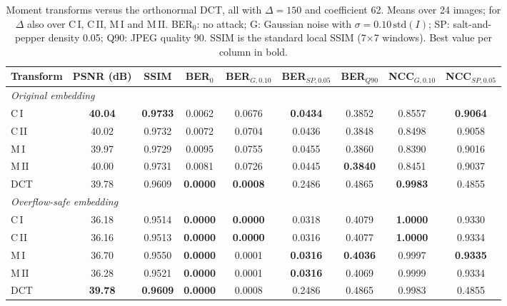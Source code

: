 \begin{table}[t]
\centering
\caption{Moment transforms versus the orthonormal DCT, all with $\Delta=150$ and coefficient 62. Means over 24 images; for $\Delta$ also over C\,I, C\,II, M\,I and M\,II. BER$_0$: no attack; G: Gaussian noise with $\sigma = 0.10\,\mathrm{std}(I)$; SP: salt-and-pepper density 0.05; Q90: JPEG quality 90. SSIM is the standard local SSIM (7$\times$7 windows). Best value per column in bold.}
\label{tab:moments_vs_baselines}
\setlength{\tabcolsep}{3pt}
\footnotesize
\begin{tabular}{lcccccccc}
\toprule
Transform & PSNR (dB) & SSIM & BER$_{0}$ & BER$_{G,0.10}$ & BER$_{SP,0.05}$ & BER$_{Q90}$ & NCC$_{G,0.10}$ & NCC$_{SP,0.05}$ \\
\midrule
\multicolumn{9}{l}{\emph{Original embedding}} \\
C\,I & \textbf{40.04} & \textbf{0.9733} & 0.0062 & 0.0676 & \textbf{0.0434} & 0.3852 & 0.8557 & \textbf{0.9064} \\
C\,II & 40.02 & 0.9732 & 0.0072 & 0.0704 & 0.0436 & 0.3848 & 0.8498 & 0.9058 \\
M\,I & 39.97 & 0.9729 & 0.0095 & 0.0755 & 0.0455 & 0.3860 & 0.8390 & 0.9016 \\
M\,II & 40.00 & 0.9731 & 0.0081 & 0.0726 & 0.0445 & \textbf{0.3840} & 0.8451 & 0.9037 \\
DCT & 39.78 & 0.9609 & \textbf{0.0000} & \textbf{0.0008} & 0.2486 & 0.4865 & \textbf{0.9983} & 0.4855 \\
\midrule
\multicolumn{9}{l}{\emph{Overflow-safe embedding}} \\
C\,I & 36.18 & 0.9514 & \textbf{0.0000} & \textbf{0.0000} & 0.0318 & 0.4079 & \textbf{1.0000} & 0.9330 \\
C\,II & 36.16 & 0.9513 & \textbf{0.0000} & \textbf{0.0000} & 0.0316 & 0.4077 & \textbf{1.0000} & 0.9334 \\
M\,I & 36.70 & 0.9550 & \textbf{0.0000} & 0.0001 & \textbf{0.0316} & \textbf{0.4036} & 0.9997 & \textbf{0.9335} \\
M\,II & 36.28 & 0.9521 & \textbf{0.0000} & 0.0001 & \textbf{0.0316} & 0.4069 & 0.9999 & 0.9334 \\
DCT & \textbf{39.78} & \textbf{0.9609} & \textbf{0.0000} & 0.0008 & 0.2486 & 0.4865 & 0.9983 & 0.4855 \\
\bottomrule
\end{tabular}
\end{table}
